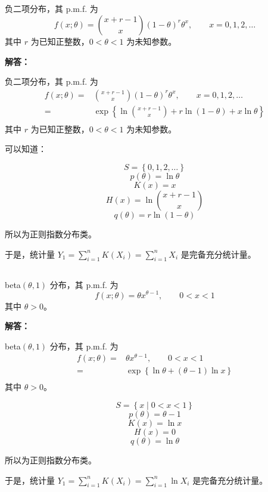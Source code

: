 \documentclass[12pt,a4paper]{article}
\begin{document}
\subsection{} 
 
负二项分布，其 p.m.f. 为
    \[
        f(x;\theta)=\binom{x+r-1}{x}(1-\theta)^r\theta^x,
        \qquad x=0,1,2,\ldots
    \]
    其中 $r$ 为已知正整数，$0<\theta<1$ 为未知参数。

\begin{answerbox}
\textbf{解答：}

负二项分布，其 p.m.f. 为
\[
\begin{aligned}
f(x;\theta)=&\binom{x+r-1}{x}(1-\theta)^r\theta^x,\qquad x=0,1,2,\ldots \\
=& \exp\left\{\ln \binom{x+r-1}{x} + r\ln(1-\theta) + x\ln \theta\right\} \\
\end{aligned}
\]
其中 $r$ 为已知正整数，$0<\theta<1$ 为未知参数。

可以知道：

$$
S = \left\{0, 1, 2, \ldots\right\}
$$
$$
p(\theta) = \ln \theta
$$
$$
K(x) = x
$$
$$
H(x) = \ln \binom{x+r-1}{x}
$$
$$
q(\theta) = r \ln(1-\theta)
$$

所以为正则指数分布类。

于是，统计量 $Y_1 = \sum_{i=1}^{n} K(X_i) = \sum_{i=1}^{n} X_i$ 是完备充分统计量。

\end{answerbox}

\subsection{} 
 
beta$(\theta,1)$ 分布，其 p.m.f. 为
    \[
        f(x;\theta)=\theta x^{\theta-1},\qquad 0<x<1
    \]
    其中 $\theta>0$。

\begin{answerbox}
\textbf{解答：}

beta$(\theta,1)$ 分布，其 p.m.f. 为
\[
\begin{aligned}
f(x;\theta)=&\theta x^{\theta-1},\qquad 0<x<1 \\
=& \exp\left\{\ln \theta + (\theta-1)\ln x\right\} \\
\end{aligned}
\]
其中 $\theta>0$。

$$
S = \left\{x \mid 0 < x < 1\right\}
$$
$$
p(\theta) = \theta - 1
$$
$$
K(x) = \ln x
$$
$$
H(x) = 0
$$
$$
q(\theta) = \ln \theta
$$

所以为正则指数分布类。

于是，统计量 $Y_1 = \sum_{i=1}^{n} K(X_i) = \sum_{i=1}^{n} \ln X_i$ 是完备充分统计量。

\end{answerbox}
\end{document}
